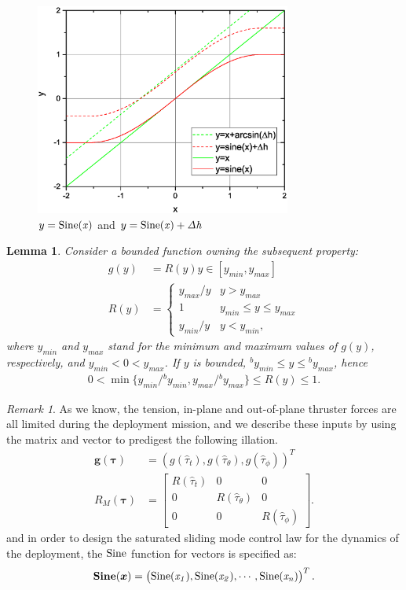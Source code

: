 \documentclass[3p]{elsarticle}
\theoremstyle{plain}
\newtheorem{mylem}{Lemma}
\theoremstyle{remark}
\newtheorem{myrem}{Remark}
\begin{document}
\begin{figure}
\centering
\includegraphics[width=0.75\textwidth]{paper4_fig2.eps}
\caption{$y =\rm{Sine}\it{(x)}$ and $y=\rm{Sine}\it{(x)}+\Delta h$}
\label{fig:2}
\end{figure}
\begin{mylem}\cite{Hu2008552}\label{lemma:2}
Consider a bounded function owning the subsequent property:
\begin{align}
g(y) &= R(y)y\in[y_{min},y_{max}]\\
R(y)&=\begin{cases}
y_{max}/y&y>y_{max}\\
1&y_{min}\le y\le y_{max}\\
y_{min}/y&y<y_{min},
\end{cases}
\end{align}
where $y_{min}$ and $y_{max}$ stand for the minimum and maximum values of $g(y)$, respectively, and $y_{min}<0<y_{max}$. If $y$ is bounded, $^by_{min}\le y\le{^by_{max}}$, hence
\begin{align}
0<\min\{y_{min}/{^by_{min}},y_{max}/{^by_{max}}\}\le R(y)\le 1.
\end{align}
\end{mylem}
\begin{myrem}
As we know, the tension, in-plane and out-of-plane thruster forces are all limited during the deployment mission, and we describe these inputs by using the matrix and vector to predigest the following illation.
\begin{align}
\bm{g}(\bm\tau) &= \left(g(\hat\tau_t),g(\hat\tau_\theta),g(\hat\tau_\phi)\right)^T\\
R_M(\bm\tau) &= \begin{bmatrix}R(\hat\tau_t)&0&0\\0&R(\hat\tau_\theta)&0\\0&0&R(\hat\tau_\phi)\end{bmatrix}.
\end{align}
and in order to design the saturated sliding mode control law for the dynamics of the deployment, the $\rm{Sine}$ function for vectors is specified as:
\begin{align}
\mathbf{Sine}(\bm x)=\begin{pmatrix}\rm{Sine}\it{(x_1)},\rm{Sine}\it{(x_2)},\cdots,\rm{Sine}\it{(x_n)}\end{pmatrix}^T.
\end{align}
\end{myrem}
\end{document}
